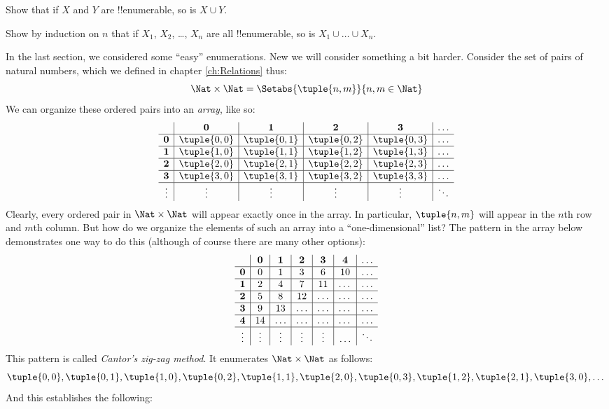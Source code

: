 \documentclass[../../../include/open-logic-section]{subfiles}
\begin{document}
\begin{prob}
Show that if $X$ and $Y$ are !!{enumerable}, so is $X \cup Y$.
\end{prob}

\begin{prob}
  Show by induction on $n$ that if $X_1$, $X_2$, \dots, $X_n$ are all
  !!{enumerable}, so is $X_1 \cup \dots \cup X_n$.
\end{prob}

\begin{explain}
In the last section, we considered some ``easy'' enumerations. New we will consider something a bit harder. Consider the set of pairs of natural numbers, which we defined in chapter \ref{ch:Relations} thus:
\[
\Nat \times \Nat = \Setabs{\tuple{n,m}}{n,m \in \Nat}
\]
We can organize these ordered pairs into an \emph{array}, like so:
\[
\begin{array}{ c | c | c | c | c | c}
& \textbf 0 & \textbf 1 & \textbf 2 & \textbf 3 & \dots \\
\hline
\textbf 0 & \tuple{0,0} & \tuple{0,1} & \tuple{0,2} & \tuple{0,3} & \dots \\
\hline
\textbf 1 & \tuple{1,0} & \tuple{1,1} & \tuple{1,2} & \tuple{1,3} & \dots \\
\hline
\textbf 2 & \tuple{2,0} & \tuple{2,1} & \tuple{2,2} & \tuple{2,3} & \dots \\
\hline
\textbf 3 & \tuple{3,0} & \tuple{3,1} & \tuple{3,2} & \tuple{3,3} & \dots \\
\hline
\vdots & \vdots & \vdots & \vdots & \vdots & \ddots\\
\end{array}
\]
Clearly, every ordered pair in $\Nat \times \Nat$ will appear
exactly once in the array. In particular, $\tuple{n,m}$ will appear in
the $n$th row and $m$th column. But how do we organize the elements of
such an array into a ``one-dimensional'' list? The pattern in the array below
demonstrates one way to do this (although of course there are many other options):
\[
\begin{array}{ c | c | c | c | c | c | c}
& \textbf 0 & \textbf 1 & \textbf 2 & \textbf 3 & \textbf 4 &\dots \\
\hline
\textbf 0 & 0  & 1& 3 & 6& 10 &\ldots \\
\hline
\textbf 1 &2 & 4& 7 & 11 & \dots &\ldots \\
\hline
\textbf 2 & 5 & 8 & 12 & \ldots & \dots&\ldots \\
\hline
\textbf 3 & 9 & 13 & \ldots & \ldots & \dots & \ldots \\
\hline
\textbf 4 & 14 & \ldots & \ldots & \ldots & \dots & \ldots \\
\hline
\vdots & \vdots & \vdots & \vdots & \vdots&\ldots & \ddots\\
\end{array}
\]\noindent
This pattern is called \emph{Cantor's zig-zag method}. It  enumerates
$\Nat \times \Nat$ as follows:
\[
\tuple{0,0}, \tuple{0,1}, \tuple{1,0}, \tuple{0,2}, \tuple{1,1},
\tuple{2,0}, \tuple{0,3}, \tuple{1,2}, \tuple{2,1}, \tuple{3,0}, \dots
\]
And this establishes the following:
\end{explain}
\end{document}
